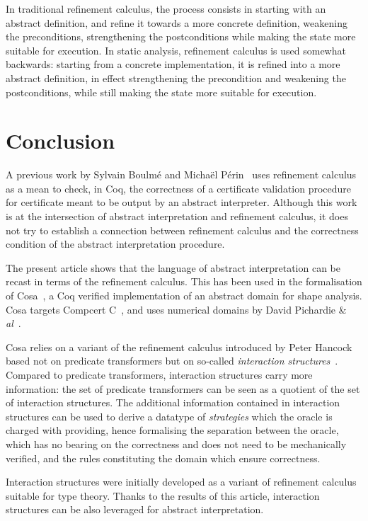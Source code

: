\documentclass[]{llncs}
\begin{document}
  \begin{theorem}
    
  \end{theorem}
\par
In traditional refinement calculus, the process consists in starting with an abstract definition, and refine it towards a more concrete definition, weakening the preconditions, strengthening the postconditions while making the state more suitable for execution. In static analysis, refinement calculus is used somewhat backwards: starting from a concrete implementation, it is refined into a more abstract definition, in effect strengthening the precondition and weakening the postconditions, while still making the state more suitable for execution.
\par
\section{Conclusion}
  A previous work by Sylvain Boulmé and Michaël Périn~\cite{Boulme2013} uses refinement calculus as a mean to check, in Coq, the correctness of a certificate validation procedure for certificate meant to be output by an abstract interpreter. Although this work is at the intersection of abstract interpretation and refinement calculus, it does not try to establish a connection between refinement calculus and the correctness condition of the abstract interpretation procedure.
\par
The present article shows that the language of abstract interpretation can be recast in terms of the refinement calculus. This has been used in the formalisation of Cosa~\cite{cosa}, a Coq verified implementation of an abstract domain for shape analysis. Cosa targets Compcert C~\cite{compcert}, and uses numerical domains by David Pichardie \& \emph{al}~\cite{Blazy2013}.
\par
Cosa relies on a variant of the refinement calculus introduced by Peter Hancock based not on predicate transformers but on so-called \emph{interaction structures}~\cite{Hancock}. Compared to predicate transformers, interaction structures carry more information: the set of predicate transformers can be seen as a quotient of the set of interaction structures. The additional information contained in interaction structures can be used to derive a datatype of \emph{strategies} which the oracle is charged with providing, hence formalising the separation between the oracle, which has no bearing on the correctness and does not need to be mechanically verified, and the rules constituting the domain which ensure correctness.
\par
Interaction structures were initially developed as a variant of refinement calculus suitable for type theory. Thanks to the results of this article, interaction structures can be also leveraged for abstract interpretation.
  
\end{document}
